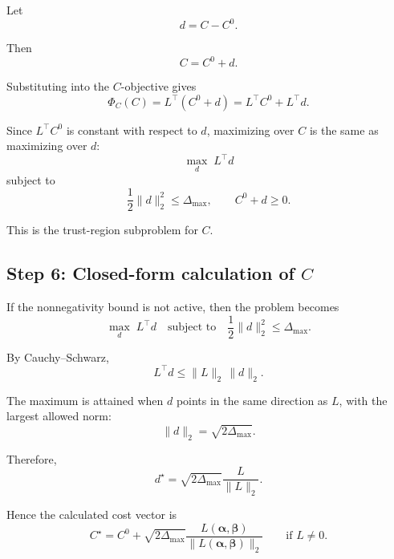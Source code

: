 \documentclass{article}
\begin{document}
Let
\begin{equation}
d = C - C^0.
\end{equation}

Then
\begin{equation}
C = C^0 + d.
\end{equation}

Substituting into the $C$-objective gives
\begin{equation}
\Phi_C(C)
=
L^\top(C^0+d)
=
L^\top C^0 + L^\top d.
\end{equation}

Since $L^\top C^0$ is constant with respect to $d$, maximizing over $C$ is the same as maximizing over $d$:
\begin{equation}
\max_d \; L^\top d
\end{equation}
subject to
\begin{equation}
\frac12\|d\|_2^2\le \Delta_{\max},
\qquad
C^0+d \ge 0.
\end{equation}

This is the trust-region subproblem for $C$.

\subsection{Step 6: Closed-form calculation of $C$}

If the nonnegativity bound is not active, then the problem becomes
\begin{equation}
\max_d \; L^\top d
\quad
\text{subject to}
\quad
\frac12\|d\|_2^2\le \Delta_{\max}.
\end{equation}

By Cauchy--Schwarz,
\begin{equation}
L^\top d \le \|L\|_2\,\|d\|_2.
\end{equation}

The maximum is attained when $d$ points in the same direction as $L$, with the largest allowed norm:
\begin{equation}
\|d\|_2=\sqrt{2\Delta_{\max}}.
\end{equation}

Therefore,
\begin{equation}
d^\star
=
\sqrt{2\Delta_{\max}}
\frac{L}{\|L\|_2}.
\end{equation}

Hence the calculated cost vector is
\begin{equation}
\boxed{
C^\star
=
C^0
+
\sqrt{2\Delta_{\max}}
\frac{L(\boldsymbol{\alpha},\boldsymbol{\beta})}{\|L(\boldsymbol{\alpha},\boldsymbol{\beta})\|_2}
}
\qquad
\text{if }L\neq 0.
\end{equation}
\end{document}
